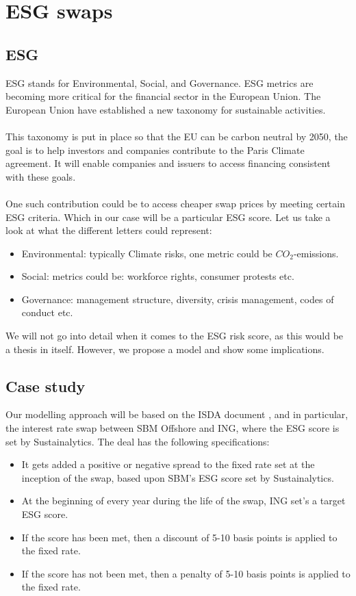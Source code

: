 \chapter{ESG swaps}
\label{chp_ESG_swaps}


\section{ESG}
ESG  stands for Environmental, Social, and Governance. ESG metrics are becoming more critical for the financial sector in the European Union. The European Union have established a new taxonomy \cite{EU:2021} for sustainable activities. 
\\~\\
This taxonomy is put in place so that the EU can be carbon neutral by 2050, the goal is to help investors and companies contribute to the Paris Climate agreement. It will enable companies and issuers to access financing consistent with these goals.
\\~\\ 
One such contribution could be to access cheaper swap prices by meeting certain ESG criteria. Which in our case will be a particular ESG score. Let us take a look at what the different letters could represent:
\begin{itemize}
    \item Environmental: typically Climate risks, one metric could be $CO_{2}$-emissions. 
    \item Social: metrics could be: workforce rights, consumer protests etc. 
    \item Governance: management structure, diversity, crisis management, codes of conduct etc. 
\end{itemize}

We will not go into detail when it comes to the ESG risk score, as this would be a thesis in itself. However, we propose a model and show some implications. 

\newpage 

\section{Case study}
Our modelling approach will be based on the ISDA document \cite{ISDA:2021}, and in particular, the interest rate swap between SBM Offshore and ING, where the ESG score is set by Sustainalytics. The deal has the following specifications:
\begin{itemize}
    \item It gets added a positive or negative spread to the fixed rate set at the inception of the swap, based upon SBM's ESG score set by Sustainalytics. 
    \item At the beginning of every year during the life of the swap, ING set's a target ESG score.
    \item If the score has been met, then a discount of 5-10 basis points is applied to the fixed rate.
    \item If the score has not been met, then a penalty of 5-10 basis points is applied to the fixed rate. 
\end{itemize} 

